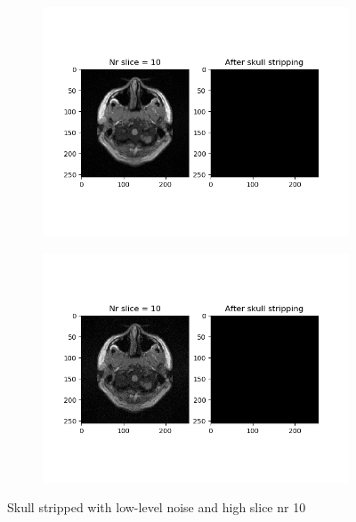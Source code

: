 \begin{figure}[H]
	\centering
	\begin{subfigure}[b]{0.35\linewidth}
		\includegraphics[scale=0.35]{figures/Module_08/M8_2.png}
	\end{subfigure}
		\begin{subfigure}[b]{0.35\linewidth}
		\includegraphics[scale=0.35]{figures/Module_08/M8_n2.png}
	\end{subfigure}
	\caption{Skull stripped with low-level noise and high slice nr 10}
	\label{fig:figures/m08_2}
\end{figure}

